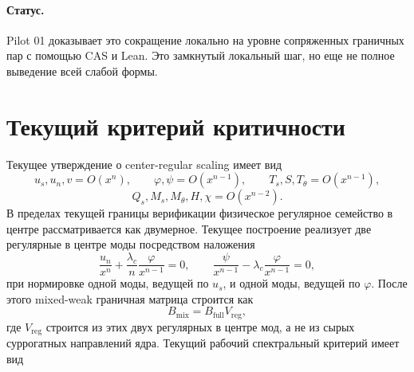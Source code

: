 \documentclass[11pt,a4paper]{article}
\begin{document}
\paragraph{Статус.}
Pilot 01 доказывает это сокращение локально на уровне сопряженных граничных
пар с помощью CAS и Lean.
Это замкнутый локальный шаг, но еще не полное выведение всей слабой формы.

\section{Текущий критерий критичности}
Текущее утверждение о center-regular scaling имеет вид
\[
u_s,u_n,v = O(x^n),
\qquad
\varphi,\psi = O(x^{n-1}),
\qquad
T_s,S,T_\theta = O(x^{n-1}),
\]
\[
Q_s,M_s,M_\theta,H,\chi = O(x^{n-2}).
\]
В пределах текущей границы верификации физическое регулярное семейство в
центре рассматривается как двумерное.
Текущее построение реализует две регулярные в центре моды посредством наложения
\[
\frac{u_n}{x^n} + \frac{\lambda_c}{n}\frac{\varphi}{x^{n-1}} = 0,
\qquad
\frac{\psi}{x^{n-1}} - \lambda_c\frac{\varphi}{x^{n-1}} = 0,
\]
при нормировке одной моды, ведущей по $u_s$, и одной моды, ведущей по
$\varphi$.
После этого mixed-weak граничная матрица строится как
\[
B_{\mathrm{mix}} = B_{\mathrm{full}} V_{\mathrm{reg}},
\]
где $V_{\mathrm{reg}}$ строится из этих двух регулярных в центре мод, а не из
сырых суррогатных направлений ядра.
Текущий рабочий спектральный критерий имеет вид
\end{document}
